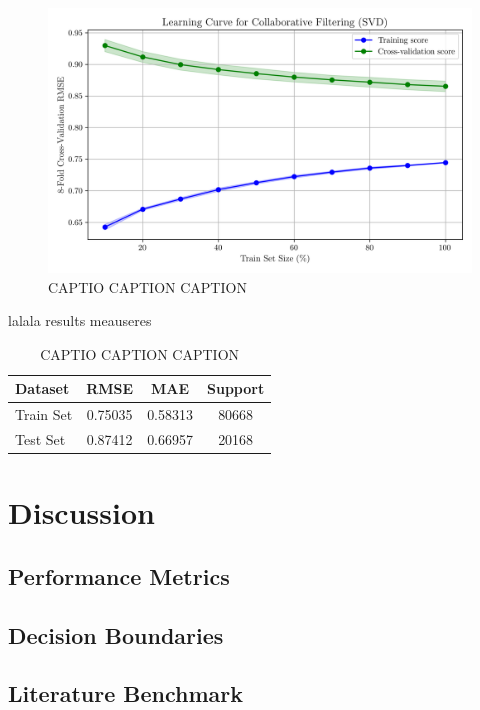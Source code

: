 \documentclass[conference]{IEEEtran}
\begin{document}
\begin{figure}[H]
    \centering
    \includegraphics[width=1\linewidth]{assets/model03_learningcurve.png}
    \caption{CAPTIO CAPTION CAPTION}
    \label{fig:model03_learningcurve}
\end{figure}

lalala results meauseres

\begin{table}[H]
\centering
\caption{CAPTIO CAPTION CAPTION}
\label{tab:model03_results}
\begin{tabular}{lccc}
\toprule
\textbf{Dataset} & \textbf{RMSE} & \textbf{MAE} & \textbf{Support} \\
\midrule
Train Set & 0.75035 & 0.58313 & 80668 \\
Test Set & 0.87412 & 0.66957 & 20168 \\
\bottomrule
\end{tabular}
\end{table}




\section{Discussion} \label{discussion_sec}
\subsection{Performance Metrics}


\subsection{Decision Boundaries}


\subsection{Literature Benchmark}
\end{document}
